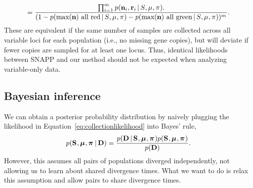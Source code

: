 \begin{linenomath}
\begin{equation}
    =
    \frac{
        \prod_{i=1}^{\nloci}
        \pr(\leafallelecounts[i], \leafredallelecounts[i] \given \sptree, \murate, \gfreq).
    }{
        (1 - \pr(\maxleafallelecounts \textrm{ all red} \given \sptree, \murate, \gfreq)
        - \pr(\maxleafallelecounts \textrm{ all green} \given \sptree, \murate, \gfreq))^{\nloci}
    }.
    \label{eq:snappvariablecomparisonlikelihood}
\end{equation}
These are equivalent if the same number of samples are collected across all
variable loci for each population (i.e., no missing gene copies), but will
deviate if fewer copies are sampled for at least one locus.
Thus, identical likelihoods between SNAPP and our method should not be expected
when analyzing variable-only data.
\end{linenomath}

\subsection{Bayesian inference}

\begin{linenomath}
We can obtain a posterior probability distribution by naively plugging the
likelihood in Equation~\ref{eq:collectionlikelihood} into Bayes' rule,
\begin{equation}
    \pr(
    \sptrees,
    \murates,
    \gfreqs
    \given
    \alldata
    )
    =
    \frac{
        \pr(
        \alldata
        \given
        \sptrees, \murates, \gfreqs
        )
        \pr(
        \sptrees,
        \murates,
        \gfreqs
        )
    }{
        \pr(
        \alldata
        )
    }.
    \label{eq:collectionindependentbayesrule}
\end{equation}
However, this assumes all pairs of populations diverged independently, not
allowing us to learn about shared divergence times.
What we want to do is relax this assumption and allow pairs to share divergence
times.
\end{linenomath}

